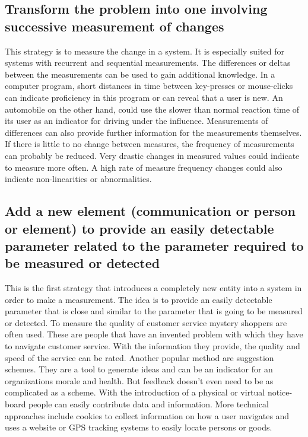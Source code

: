 \subsection[Measure changes]{Transform the problem into one involving successive measurement of changes}

This strategy is to measure the change in a system.
It is especially suited for systems with recurrent and sequential measurements.
The differences or deltas between the measurements can be used to gain additional knowledge.
In a computer program, short distances in time between key-presses or mouse-clicks can indicate proficiency in this program or can reveal that a user is new.
An automobile on the other hand, could use the slower than normal reaction time of its user as an indicator for driving under the influence.
Measurements of differences can also provide further information for the measurements themselves.
If there is little to no change between measures, the frequency of measurements can probably be reduced.
Very drastic changes in measured values could indicate to measure more often.
A high rate of measure frequency changes could also indicate non-linearities or abnormalities.

\subsection[Add new element to measure]{Add a new element (communication or person or element) to provide an easily detectable parameter related to the parameter required to be measured or detected}

This is the first strategy that introduces a completely new entity into a system in order to make a measurement.
The idea is to provide an easily detectable parameter that is close and similar to the parameter that is going to be measured or detected.
To measure the quality of customer service mystery shoppers are often used.
These are people that have an invented problem with which they have to navigate customer service.
With the information they provide, the quality and speed of the service can be rated.
Another popular method are suggestion schemes.
They are a tool to generate ideas and can be an indicator for an organizations morale and health.
But feedback doesn't even need to be as complicated as a scheme.
With the introduction of a physical or virtual notice-board people can easily contribute data and information.
More technical approaches include cookies to collect information on how a user navigates and uses a website or GPS tracking systems to easily locate persons or goods.


